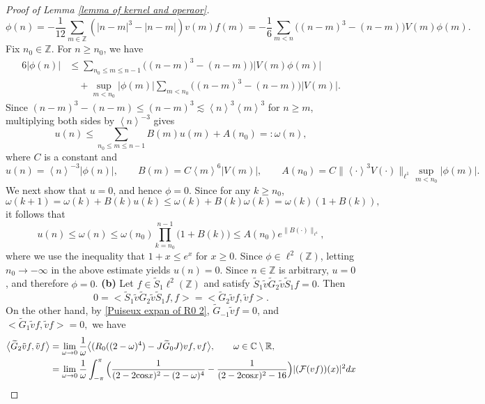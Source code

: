 \documentclass[reqno, 11pt]{amsart}
\newcommand\R{\mathbb{R}}
\newcommand\Z{\mathbb{Z}}
\newcommand\C{\mathbb{C}}
\newcommand\mcaF{\mathcal{F}}
\numberwithin{equation}{section}
\begin{document}
\begin{proof}[Proof of Lemma {\ref{lemma of kernel and operaor}}]
\begin{equation*}
\phi(n)=-\frac{1}{12}\sum\limits_{m\in\Z}^{}\left(|n-m|^3-|n-m|\right)v(m)f(m)=-\frac{1}{6}\sum\limits_{m<n}\big((n-m)^3-(n-m)\big)V(m)\phi(m).
\end{equation*}
Fix $n_0\in\Z$. For $n\geq n_0$, we have
\begin{align*}
6|\phi(n)|&\leq\sum\limits_{n_0\leq m\leq n-1}\big((n-m)^3-(n-m)\big)|V(m)\phi(m)|\\
&\quad+\sup\limits_{m<n_0}|\phi(m)|\sum\limits_{m<n_0}\big((n-m)^3-(n-m)\big)|V(m)|.
\end{align*}
Since $(n-m)^3-(n-m)\leq (n-m)^3\lesssim\left<n\right>^3\left<m\right>^3$ for $n\geq m$, multiplying both sides by $\left<n\right>^{-3}$ gives
\begin{equation}\label{rela of u and omega}
u(n)\leq\sum\limits_{n_0\leq m\leq n-1}B(m)u(m)+A(n_0)=:\omega(n),
\end{equation}
where $C$ is a constant and $$u(n)=\left<n\right>^{-3}|\phi(n)|,\qquad B(m)=C\left<m\right>^{6}|V(m)|,\qquad A(n_0)=C\|{\left<\cdot\right>}^3V(\cdot)\|_{\ell^1}\sup\limits_{m<n_0}|\phi(m)|.$$
We next show that $u=0$, and hence $\phi=0$. Since for any $k\geq n_0$, 
$$\omega(k+1)=\omega(k)+B(k)u(k)\leq \omega(k)+B(k)\omega(k)=\omega(k)(1+B(k)),$$
it follows that
$$u(n)\leq\omega(n)\leq \omega(n_0)
\prod_{k=n_0}^{n-1}\bigl(1+B(k)\bigr)\leq A(n_0)e^{\|B(\cdot)\|_{\ell^1}},$$
where we use the inequality that $1+x\leq e^{x}$ for $x\geq0$. Since $\phi\in\ell^2(\Z)$, letting $n_0\to-\infty$ in the above estimate yields $u(n)=0$. Since $n\in\Z$ is arbitrary, $u=0$, and therefore $\phi=0$.
\vskip0.1cm
{\bf{(b)}} Let $f\in \widetilde{S}_1\ell^2(\Z)$ and satisfy $\widetilde{S}_1\tilde{v}\widetilde{G}_2\tilde{v}\widetilde{S}_1f=0$. Then
\begin{equation*}
0=\big<\widetilde{S}_1\tilde{v}\widetilde{G}_2\tilde{v}\widetilde{S}_1f,f\big>=\big<\widetilde{G}_2\tilde{v}f,\tilde{v}f\big>.
\end{equation*}
On the other hand, by
 \eqref{Puiseux expan of R0 2},
$\widetilde{G}_{-1}\tilde{v}f=0$, and $\big<\widetilde{G}_1\tilde{v}f,\tilde{v}f\big>=0,$
we have
\begin{align*}
\big<\widetilde{G}_2\tilde{v}f,\tilde{v}f\big>&=\lim\limits_{\omega\rightarrow0}\frac{1}{\omega}\big<(R_0((2-\omega)^4)-J\widetilde{G}_0J)vf,vf\big>,\qquad\omega\in\C\setminus\R,\\
&=\lim\limits_{\omega\rightarrow0}\frac{1}{\omega}\int_{-\pi}^{\pi}\Big(\frac{1}{(2-2{\rm cos}x)^2-(2-\omega)^4}-\frac{1}{(2-2{\rm cos}x)^2-16}\Big)|(\mcaF (vf))(x)|^2dx\\

\end{align*}
\end{proof}
\end{document}
